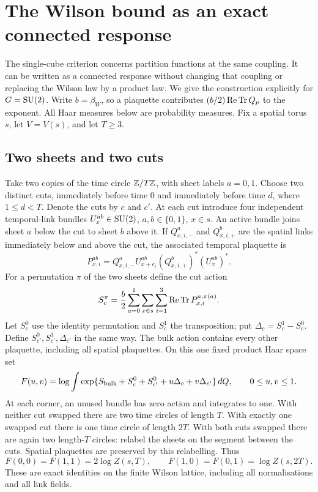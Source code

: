\section{The Wilson bound as an exact connected response}\label{cl:sec:replica}

The single-cube criterion concerns partition functions at the same coupling.
It can be written as a connected response without changing that coupling or
replacing the Wilson law by a product law. We give the construction explicitly
for $G=\mathrm{SU}(2)$. Write $b=\beta_W$, so a plaquette contributes
$(b/2)\operatorname{Re}\operatorname{Tr} Q_p$ to the exponent. All Haar measures below are probability
measures. Fix a spatial torus $s$, let $V=V(s)$, and let $T\ge3$.

\subsection{Two sheets and two cuts}
Take two copies of the time circle $\mathbb{Z}/T\mathbb{Z}$, with sheet labels $a=0,1$.
Choose two distinct cuts, immediately before time $0$ and immediately before
time $d$, where $1\le d<T$. Denote the cuts by $c$ and $c'$.
At each cut introduce four independent temporal-link bundles
$U^{ab}_x\in\mathrm{SU}(2)$, $a,b\in\{0,1\}$, $x\in s$.
An active bundle joins sheet $a$ below the cut to sheet $b$ above it.
If $Q^a_{x,i,-}$ and $Q^b_{x,i,+}$ are the spatial links immediately
below and above the cut, the associated temporal plaquette is
\[
P^{ab}_{x,i}=Q^a_{x,i,-}U^{ab}_{x+e_i}
                 (Q^b_{x,i,+})^*(U^{ab}_x)^*.
\]
For a permutation $\pi$ of the two sheets define the cut action
\[
S_c^\pi=\frac b2\sum_{a=0}^1\sum_{x\in s}\sum_{i=1}^3
                         \operatorname{Re}\operatorname{Tr} P^{a,\pi(a)}_{x,i}.
\]
Let $S_c^0$ use the identity permutation and $S_c^1$ the transposition;
put $\Delta_c=S_c^1-S_c^0$. Define $S_{c'}^0,S_{c'}^1,\Delta_{c'}$
in the same way. The bulk action contains every other plaquette, including
all spatial plaquettes. On this one fixed product Haar space set
\begin{equation}\label{cl:eq:replica-F}
F(u,v)=\log\int\exp\{S_{\rm bulk}+S_c^0+S_{c'}^0
                              +u\Delta_c+v\Delta_{c'}\}\,dQ,
\qquad 0\le u,v\le1.
\end{equation}
At each corner, an unused bundle has zero action and integrates to one.
With neither cut swapped there are two time circles of length $T$.
With exactly one swapped cut there is one time circle of length $2T$.
With both cuts swapped there are again two length-$T$ circles: relabel
the sheets on the segment between the cuts. Spatial plaquettes are
preserved by this relabelling. Thus
\begin{equation}\label{cl:eq:replica-corners}
F(0,0)=F(1,1)=2\log Z(s,T),\qquad
F(1,0)=F(0,1)=\log Z(s,2T).
\end{equation}
These are exact identities on the finite Wilson lattice, including all
normalisations and all link fields.

